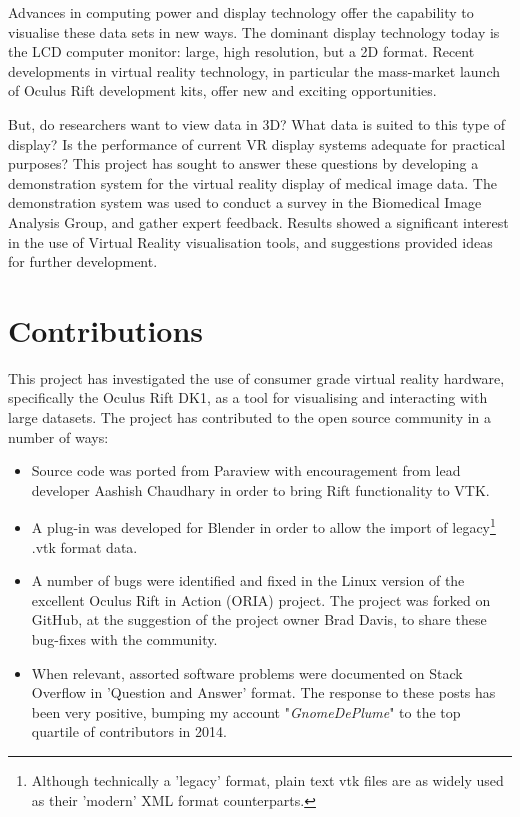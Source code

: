 \documentclass[MSc,paper=a4,pagesize=auto]{icldt}
\begin{document}
Advances in computing power and display technology offer the capability to visualise these data sets in new ways. The dominant display technology today is the LCD computer monitor: large, high resolution, but a 2D format. Recent developments in virtual reality technology, in particular the mass-market launch of Oculus Rift development kits, offer new and exciting opportunities.

But, do researchers want to view data in 3D? What data is suited to this type of display? Is the performance of current VR display systems adequate for practical purposes? This project has sought to answer these questions by developing a demonstration system for the virtual reality display of medical image data. The demonstration system was used to conduct a survey in the Biomedical Image Analysis Group, and gather expert feedback. Results showed a significant interest in the use of Virtual Reality visualisation tools, and suggestions provided ideas for further development.

\newpage
\section{Contributions}
This project has investigated the use of consumer grade virtual reality hardware, specifically the Oculus Rift DK1, as a tool for visualising and interacting with large datasets. The project has contributed to the open source community in a number of ways:

\begin{itemize}
  \item Source code was ported from Paraview with encouragement from lead developer Aashish Chaudhary in order to bring Rift functionality to VTK.
  \item A plug-in was developed for Blender in order to allow the import of legacy\footnote{Although technically a 'legacy' format, plain text vtk files are as widely used as their 'modern' XML format counterparts.} .vtk format data.
  \item A number of bugs were identified and fixed in the Linux version of the excellent Oculus Rift in Action (ORIA) project. The project was forked on GitHub, at the suggestion of the project owner Brad Davis, to share these bug-fixes with the community.
  \item When relevant, assorted software problems were documented on Stack Overflow in 'Question and Answer' format. The response to these posts has been very positive, bumping my account "\textit{GnomeDePlume}" to the top quartile of contributors in 2014.  
\end{itemize}
\end{document}
